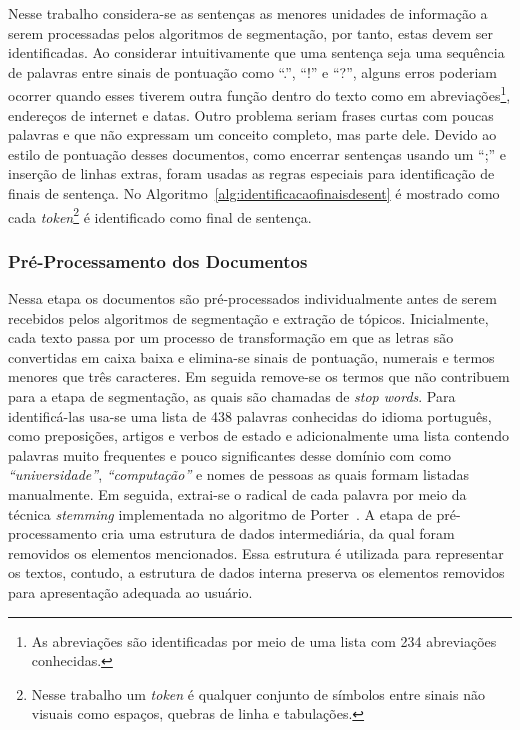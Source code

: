 Nesse trabalho considera-se as sentenças as menores unidades de informação a serem processadas pelos algoritmos de segmentação, por tanto, estas devem ser identificadas. Ao considerar intuitivamente que uma sentença seja uma sequência de palavras entre sinais de pontuação como ``.'', ``!'' e ``?'', alguns erros poderiam ocorrer quando esses tiverem outra função dentro do texto como em abreviações\footnote{As abreviações são identificadas por meio de uma lista com 234 abreviações conhecidas.}, endereços de internet e datas. Outro problema seriam frases curtas com poucas palavras e que não expressam um conceito completo, mas parte dele. Devido ao estilo de pontuação desses documentos, como encerrar sentenças usando um ``;'' e inserção de linhas extras, foram usadas as regras especiais para identificação de finais de sentença. No Algoritmo~\ref{alg:identificacaofinaisdesent} é mostrado como cada \textit{token}\footnote{Nesse trabalho um \textit{token} é qualquer conjunto de símbolos entre sinais não visuais como espaços, quebras de linha e tabulações.} é identificado  como final de sentença.  %







\subsubsection{Pré-Processamento dos Documentos}



Nessa etapa os documentos são pré-processados individualmente antes de serem recebidos pelos algoritmos de segmentação e extração de tópicos. Inicialmente, cada texto passa por um processo de transformação em que as letras são convertidas em caixa baixa e elimina-se sinais de pontuação, numerais e termos menores que três caracteres. Em seguida remove-se os termos que não contribuem para a etapa de segmentação, as quais são chamadas de \textit{stop words}. Para identificá-las usa-se uma lista de 438 palavras conhecidas do idioma português, como preposições, artigos e verbos de estado e adicionalmente uma lista contendo palavras muito frequentes e pouco significantes desse domínio com como \textit{``universidade''}, \textit{``computação''} e nomes de pessoas as quais formam listadas manualmente. Em seguida, extrai-se o radical de cada palavra por meio da técnica \textit{stemming} implementada no algoritmo de Porter~\cite{Porter1997}. A etapa de pré-processamento cria uma estrutura de dados intermediária, da qual foram removidos os elementos mencionados. Essa estrutura é utilizada para representar os textos, contudo, a estrutura de dados interna preserva os elementos removidos para apresentação adequada ao usuário.
 
